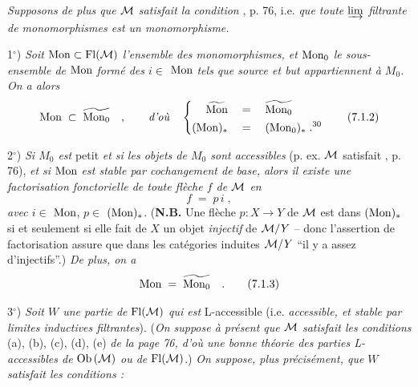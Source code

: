 \textit{Supposons de plus que $\mathcal{M}$ satisfait la condition} , p. 76, i.e. \textit{que toute $\varinjlim$ filtrante de monomorphismes est un monomorphisme.}

1$^{\circ}$) \textit{Soit} $\mathrm{Mon} \subset \mathrm{Fl}(\mathcal{M})$ \textit{l'ensemble des monomorphismes, et} $\mathrm{Mon}_0$ \textit{le sous-ensemble de} $\mathrm{Mon}$ \textit{formé des $i \in$} $\mathrm{Mon}$ \textit{tels que source et but appartiennent à $M_0$. On a alors}
\[
\Mon \;\subset\; \widetilde{\Mon_0} \quad , \qquad \text{\textit{d'où}} \quad
\left\{
\begin{aligned}
\widetilde{\Mon} \quad &= \quad \widetilde{\Mon_0} \\
(\Mon)_{*} \quad &= \quad (\Mon_0)_{*} \;.\text{\footnotemark[30]}
\end{aligned}
\right.
\tag*{(7.1.2)}
\]

2$^{\circ}$) \textit{Si $M_0$ est} petit \textit{et si les objets de $M_0$ sont accessibles} (p. ex. $\mathcal{M}$ satisfait , p. 76), \textit{et si} $\mathrm{Mon}$ \textit{est stable par cochangement de base, alors il existe une factorisation fonctorielle de toute flèche $f$ de $\mathcal{M}$ en}
\[
f \;=\; p\, i \;,
\]
\textit{avec $i \in$} $\mathrm{Mon}$, \textit{$p \in$} $(\mathrm{Mon})_{*}$. (\textbf{N.B.} Une flèche $p : X \longrightarrow Y$ de $\mathcal{M}$ est dans $(\mathrm{Mon})_{*}$ si et seulement si elle fait de $X$ un objet \textit{injectif} de $\mathcal{M}/Y$ -- donc l'assertion de factorisation assure que dans les catégories induites $\mathcal{M}/Y$ “il y a assez d'injectifs”.) \textit{De plus, on a}
\[
\mathrm{Mon} \;=\; \widetilde{\mathrm{Mon}_0} \quad .
\tag*{(7.1.3)}
\]

3$^{\circ}$) \textit{Soit $W$ une partie de} $\mathrm{Fl}(\mathcal{M})$ \textit{qui est} L-accessible (i.e. \textit{accessible, et stable par limites inductives filtrantes}). (\textit{On suppose à présent que $\mathcal{M}$ satisfait les conditions} (a), (b), (c), (d), (e) \textit{de la page 76, d'où une bonne théorie des parties L-accessibles de} $\mathrm{Ob}\,(\mathcal{M})$ \textit{ou de} $\mathrm{Fl}(\mathcal{M})$.) \textit{On suppose, plus précisément, que $W$ satisfait les conditions :}


